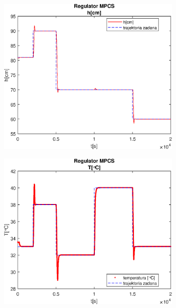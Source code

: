 \begin{figure}[h!]
   \centering
   \begin{subfigure}[b]{0.4\textwidth}
      \includegraphics[width=1\linewidth]{img/MPCSanaLin/MPCSLinHN300Nu100l10.eps}
      \caption{}
      \label{fig:fig:MPCSLinN300Nu100l101}
   \end{subfigure}
       
   \begin{subfigure}[b]{0.4\textwidth}
      \includegraphics[width=1\linewidth]{img/MPCSanaLin/MPCSLinTN300Nu100l10.eps}
      \caption{}
      \label{fig:fig:MPCSLinN300Nu100l102}
   \end{subfigure}
       

\end{figure}
